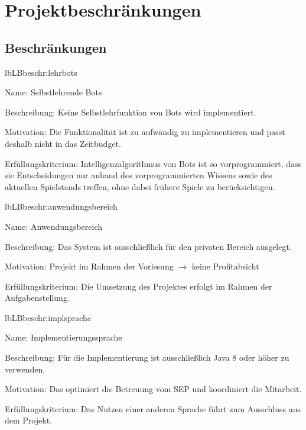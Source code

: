 \chapter{Projektbeschränkungen}

\section{Beschränkungen}

\setcounter{lb}{10}

\begin{description}[leftmargin=5em, style=sameline]
	
	\begin{lhp}{lb}{LB}{beschr:lehrbots}
		\item [Name:] Selbstlehrende Bots
		\item [Beschreibung:] Keine Selbstlehrfunktion von Bots wird implementiert.
		\item [Motivation:] Die Funktionalität ist zu aufwändig zu implementieren und passt deshalb nicht in das Zeitbudget.
		\item [Erfüllungskriterium:] Intelligenzalgorithmus von Bots ist so vorprogrammiert, dass sie Entscheidungen nur anhand des vorprogrammierten Wissens sowie des aktuellen Spielstands treffen, ohne dabei frühere Spiele zu berücksichtigen.
	\end{lhp}
	
	\begin{lhp}{lb}{LB}{beschr:anwendungsbereich}
		\item [Name:] Anwendungsbereich
		\item [Beschreibung:] Das System ist ausschließlich für den privaten Bereich ausgelegt.
		\item [Motivation:] Projekt im Rahmen der Vorlesung $\rightarrow$ keine Profitabsicht
		\item [Erfüllungskriterium:] Die Umsetzung des Projektes erfolgt im Rahmen der Aufgabenstellung.
	\end{lhp}
	
		
	\begin{lhp}{lb}{LB}{beschr:implsprache}
		\item [Name:] Implementierungssprache
		\item [Beschreibung:] Für die Implementierung ist ausschließlich Java 8 oder höher zu verwenden.
		\item [Motivation:] Das optimiert die Betreuung vom SEP und koordiniert die Mitarbeit.
		\item [Erfüllungskriterium:] Das Nutzen einer anderen Sprache führt zum Ausschluss aus dem Projekt.
	\end{lhp}
	

\end{description}
